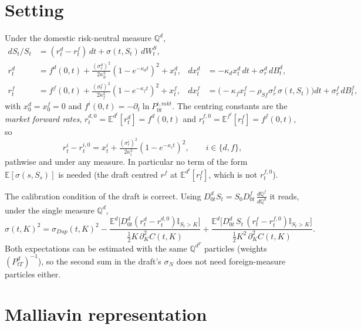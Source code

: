 \documentclass[11pt,a4paper]{article}
\theoremstyle{plain}
\theoremstyle{remark}
\newcommand{\E}{\mathbb{E}}
\newcommand{\Q}{\mathbb{Q}}
\newcommand{\I}{\mathbb{I}}
\newcommand{\sgd}{\sigma^d_r}
\newcommand{\sgf}{\sigma^f_r}
\begin{document}
\section{Setting}

Under the domestic risk-neutral measure $\Q^d$,
\begin{align*}
dS_t/S_t &= (r^d_t-r^f_t)\,dt+\sigma(t,S_t)\,dW^S_t,\\
r^d_t &= f^d(0,t)+\tfrac{(\sgd)^2}{2\kappa_d^2}(1-e^{-\kappa_dt})^2+x^d_t,
 & dx^d_t &= -\kappa_dx^d_t\,dt+\sgd\,dB^d_t,\\
r^f_t &= f^f(0,t)+\tfrac{(\sgf)^2}{2\kappa_f^2}(1-e^{-\kappa_ft})^2+x^f_t,
 & dx^f_t &= \big(-\kappa_fx^f_t-\rho_{Sf}\sgf\,\sigma(t,S_t)\big)dt+\sgf\,dB^f_t,
\end{align*}
with $x^d_0=x^f_0=0$ and $f^i(0,t)=-\partial_t\ln P^{i,mkt}_{0t}$. The centring
constants are the \emph{market forward rates},
$r^{d,0}_t=\E^{d^t}[r^d_t]=f^d(0,t)$ and $r^{f,0}_t=\E^{f^t}[r^f_t]=f^f(0,t)$, so
\[
r^i_t-r^{i,0}_t = x^i_t+\tfrac{(\sigma^i_r)^2}{2\kappa_i^2}(1-e^{-\kappa_it})^2,
\qquad i\in\{d,f\},
\]
pathwise and under any measure. In particular no term of the form
$\E[\sigma(s,S_s)]$ is needed (the draft centred $r^f$ at
$\E^{d^t}[r^f_t]$, which is not $r^{f,0}_t$).

The calibration condition of the draft is correct. Using
$D^d_{0t}S_t=S_0D^f_{0t}\,\frac{d\Q^f}{d\Q^d}$ it reads, under the single
measure $\Q^d$,
\begin{equation}\label{eq:calib}
\sigma(t,K)^2=\sigma_{Dup}(t,K)^2
-\frac{\E^d\big[D^d_{0t}(r^d_t-r^{d,0}_t)\I_{S_t>K}\big]}{\tfrac12K\,\partial_K^2C(t,K)}
+\frac{\E^d\big[D^d_{0t}\,S_t\,(r^f_t-r^{f,0}_t)\I_{S_t>K}\big]}{\tfrac12K^2\,\partial_K^2C(t,K)} .
\end{equation}
Both expectations can be estimated with the same $\Q^{d^T}$ particles (weights
$(P^d_{tT})^{-1}$), so the second sum in the draft's $\sigma_N$ does not need
foreign-measure particles either.

\section{Malliavin representation}\label{sec:tangent}
\end{document}

